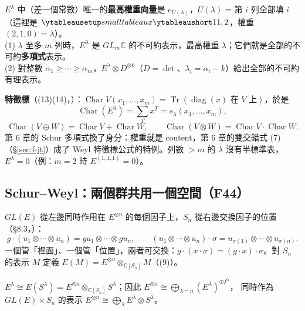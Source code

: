 \begin{thmbox}
$E^\lambda$ 中（差一個常數）唯一的\textbf{最高權重向量}是 $e_{U(\lambda)}$，$U(\lambda)$ = 第 $i$ 列全部填 $i$（這裡是 $\yts{11,2}$，權重 $(2,1,0)=\lambda$）。\\
(1) $\lambda$ 至多 $m$ 列時，$E^\lambda$ 是 $GL_m\mathbb C$ 的不可約表示，最高權重 $\lambda$；它們就是全部的不可約\textbf{多項式}表示。\\
(2) 對整數 $\alpha_1\ge\cdots\ge\alpha_m$，$E^\lambda\otimes D^{\otimes k}$（$D=\det$、$\lambda_i=\alpha_i-k$）給出全部的不可約有理表示。
\end{thmbox}

\textbf{特徵標}（(13)(14)，）：$\operatorname{Char}V(x_1,\ldots,x_m)=\operatorname{Tr}(\operatorname{diag}(x)\text{ 在 }V\text{ 上})$，於是
\[
\operatorname{Char}(E^\lambda)=\sum_T x^T=s_\lambda(x_1,\ldots,x_m),
\]
\[
\operatorname{Char}(V\oplus W)=\operatorname{Char}V+\operatorname{Char}W,\qquad \operatorname{Char}(V\otimes W)=\operatorname{Char}V\cdot\operatorname{Char}W .
\]
第 6 章的 Schur 多項式換了身分：權重就是 content，第 6 章的雙交錯式 (7)（\S\ref{sec:f-jt}）成了 Weyl 特徵標公式的特例。列數 $>m$ 的 $\lambda$ 沒有半標準表，$E^\lambda=0$（例：$m=2$ 時 $E^{(1,1,1)}=0$）。

\subsection{Schur–Weyl：兩個群共用一個空間（F44）}\label{sec:f-schurweyl}

$GL(E)$ 從左邊同時作用在 $E^{\otimes n}$ 的每個因子上，$S_n$ 從右邊交換因子的位置（\S8.3，）：
\[
g\cdot(u_1\otimes\cdots\otimes u_n)=gu_1\otimes\cdots\otimes gu_n,\qquad (u_1\otimes\cdots\otimes u_n)\cdot\sigma=u_{\sigma(1)}\otimes\cdots\otimes u_{\sigma(n)} .
\]
一個管「裡面」、一個管「位置」，兩者可交換：$g\cdot(x\cdot\sigma)=(g\cdot x)\cdot\sigma$。對 $S_n$ 的表示 $M$ 定義 $E(M)=E^{\otimes n}\otimes_{\mathbb C[S_n]}M$（(9)）。

\begin{thmbox}[命題 1、推論 1 \fulref{p.118--119}]
$E^\lambda\cong E(S^\lambda)=E^{\otimes n}\otimes_{\mathbb C[S_n]}S^\lambda$；因此 $E^{\otimes n}\cong\bigoplus_{\lambda\vdash n}(E^\lambda)^{\oplus f^\lambda}$，
同時作為 $GL(E)\times S_n$ 的表示 $E^{\otimes n}\cong\bigoplus_\lambda E^\lambda\otimes S^\lambda$。
\end{thmbox}

